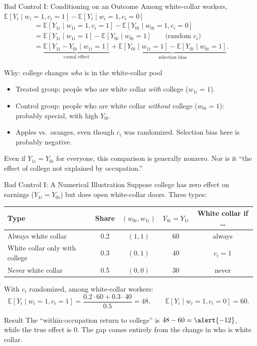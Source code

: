 \documentclass[aspectratio=169,11pt]{beamer}
\newcommand{\E}{\mathbb{E}}
\begin{document}
\begin{frame}{Bad Control I: Conditioning on an Outcome}
\small
Among white-collar workers, $\E[Y_i\mid w_i=1,c_i=1]-\E[Y_i\mid w_i=1,c_i=0]$
\[
\begin{aligned}
&=\E[Y_{1i}\mid w_{1i}=1,c_i=1]-\E[Y_{0i}\mid w_{0i}=1,c_i=0]\\
&=\E[Y_{1i}\mid w_{1i}=1]-\E[Y_{0i}\mid w_{0i}=1]\qquad\text{(random $c_i$)}\\
&=\underbrace{\E[Y_{1i}-Y_{0i}\mid w_{1i}=1]}_{\text{causal effect}}
+\underbrace{\E[Y_{0i}\mid w_{1i}=1]-\E[Y_{0i}\mid w_{0i}=1]}_{\text{selection bias}} .
\end{aligned}
\]
\begin{block}{Why: college changes \emph{who} is in the white-collar pool}
\begin{itemize}
\item Treated group: people who are white collar \emph{with} college ($w_{1i}=1$).
\item Control group: people who are white collar \emph{without} college ($w_{0i}=1$): probably special, with high $Y_{0i}$.
\item[$\Rightarrow$] Apples vs.\ oranges, even though $c_i$ was randomized. Selection bias here is probably \alert{negative}.
\end{itemize}
\end{block}
Even if $Y_{1i}=Y_{0i}$ for everyone, this comparison is generally nonzero. Nor is it ``the effect of college not explained by occupation.''
\end{frame}

\begin{frame}{Bad Control I: A Numerical Illustration}
\small
Suppose college has \alert{zero} effect on earnings ($Y_{1i}=Y_{0i}$) but does open white-collar doors. Three types:
\medskip
\begin{center}
\renewcommand{\arraystretch}{1.25}
\begin{tabular}{@{}lcccc@{}}
\toprule
Type & Share & $(w_{0i},w_{1i})$ & $Y_{0i}=Y_{1i}$ & White collar if \dots\\
\midrule
Always white collar & 0.2 & $(1,1)$ & 60 & always\\
White collar only with college & 0.3 & $(0,1)$ & 40 & $c_i=1$\\
Never white collar & 0.5 & $(0,0)$ & 30 & never\\
\bottomrule
\end{tabular}
\end{center}
\medskip
With $c_i$ randomized, among white-collar workers:
\[
\E[Y_i\mid w_i{=}1,c_i{=}1]=\frac{0.2\cdot60+0.3\cdot40}{0.5}=48,
\qquad
\E[Y_i\mid w_i{=}1,c_i{=}0]=60.
\]
\begin{block}{Result}
The ``within-occupation return to college'' is $48-60=\alert{-12}$, while the true effect is $0$.
The gap comes entirely from the change in who is white collar.
\end{block}
\end{frame}
\end{document}
